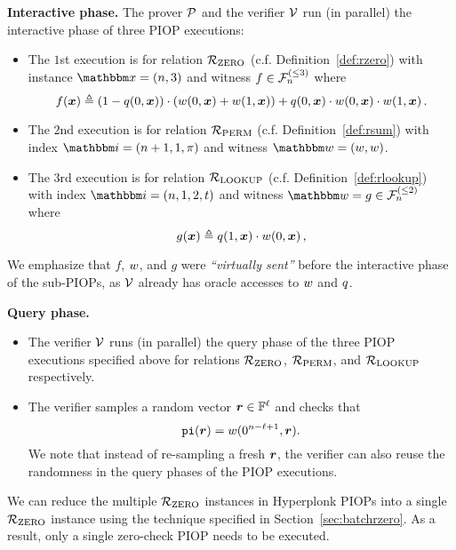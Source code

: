 \textbf{Interactive phase.} 
The prover $\mathcal{P}$ and the verifier $\mathcal{V}$ run (in parallel) the interactive phase 
of three PIOP executions:
        \begin{itemize}
            \item The $1$st execution is for relation ${\mathcal{R}}_{\text{ZERO}}$ (c.f. Definition~\ref{def:rzero}) 
                with instance $\instR = (n, 3)$ and witness $f \in {\mathcal{F}}_{n}^{(\le{3})}$ where
                \[
                    f(\boldsymbol{x}) \mathrel{\triangleq} (1-q(0, \boldsymbol{x}))\cdot (w(0, \boldsymbol{x}) + w(1, \boldsymbol{x})) 
                               + q(0, \boldsymbol{x}) \cdot w(0, \boldsymbol{x}) \cdot w(1, \boldsymbol{x})\,.
                \]
            \item The $2$nd execution is for relation ${\mathcal{R}}_{\text{PERM}}$ (c.f. Definition~\ref{def:rsum})
                with index $\idxR = (n+1, 1, \perm)$ and witness $\witR = (\witp, \witp)$.
            \item The $3$rd execution is for relation ${\mathcal{R}}_{\text{LOOKUP}}$ (c.f. Definition~\ref{def:rlookup})
                with index $\idxR = (n, 1, 2, \tabp)$ and witness $\witR = g \in \bdp{n}{2}$ where 
                \[
                    g(\boldsymbol{x}) \mathrel{\triangleq} q(1, \boldsymbol{x}) \cdot w(0, \boldsymbol{x}) \,,
                \]
        \end{itemize}
        We emphasize that $f$, $w$, and $g$ were \emph{``virtually sent''} before the interactive
        phase of the sub-PIOPs, as $\mathcal{V}$ already has oracle accesses to $w$ and $q$.

\textbf{Query phase.}
\begin{itemize}
    \item The verifier $\mathcal{V}$ runs (in parallel) the query phase of the three PIOP 
    executions specified above for relations ${\mathcal{R}}_{\text{ZERO}}$, ${\mathcal{R}}_{\text{PERM}}$, and ${\mathcal{R}}_{\text{LOOKUP}}$ respectively.
    \item The verifier samples a random vector $\boldsymbol{r} \in \mathbb{F}^{\ell}$ and checks that
        \[
            \mathtt{pi}(\boldsymbol{r}) = w(0^{n-\ell+1}, \boldsymbol{r}).
        \]
        We note that instead of re-sampling a fresh $\boldsymbol{r}$, the verifier can also reuse the randomness
        in the query phases of the PIOP executions.
\end{itemize}

\begin{remark}
    We can reduce the multiple ${\mathcal{R}}_{\text{ZERO}}$ instances in Hyperplonk PIOPs into a 
    single ${\mathcal{R}}_{\text{ZERO}}$ instance using the technique specified in Section~\ref{sec:batchrzero}.
    As a result, only a single zero-check PIOP needs to be executed.
\end{remark}


